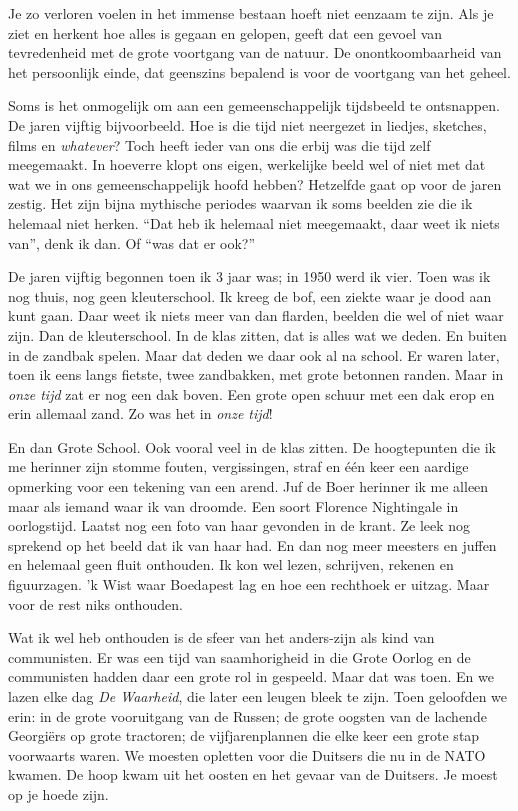 \documentclass[10pt,twoside, openright]{memoir}
\begin{document}
Je zo verloren voelen in het immense bestaan hoeft niet eenzaam te zijn. Als je ziet en herkent hoe alles is gegaan en gelopen, geeft dat een gevoel van tevredenheid met de grote voortgang van de natuur. De onontkoombaarheid van het persoonlijk einde, dat geenszins bepalend is voor de voortgang van het geheel.

Soms is het onmogelijk om aan een gemeenschappelijk tijdsbeeld te ontsnappen. De jaren vijftig bijvoorbeeld. Hoe is die tijd niet neergezet in liedjes, sketches, films en \emph{whatever}? Toch heeft ieder van ons die erbij was die tijd zelf meegemaakt. In hoeverre klopt ons eigen, werkelijke beeld wel of niet met dat wat we in ons gemeenschappelijk hoofd hebben? Hetzelfde gaat op voor de jaren zestig. Het zijn bijna mythische periodes waarvan ik soms beelden zie die ik helemaal niet herken. ``Dat heb ik helemaal niet meegemaakt, daar weet ik niets van'', denk ik dan. Of ``was dat er ook?''

De jaren vijftig begonnen toen ik 3 jaar was; in 1950 werd ik vier. Toen was ik nog thuis, nog geen kleuterschool. Ik kreeg de bof, een ziekte waar je dood aan kunt gaan. Daar weet ik niets meer van dan flarden, beelden die wel of niet waar zijn. Dan de kleuterschool. In de klas zitten, dat is alles wat we deden. En buiten in de zandbak spelen. Maar dat deden we daar ook al na school. Er waren later, toen ik eens langs fietste, twee zandbakken, met grote betonnen randen. Maar in \emph{onze tijd} zat er nog een dak boven. Een grote open schuur met een dak erop en erin allemaal zand. Zo was het in \emph{onze tijd}!

En dan Grote School. Ook vooral veel in de klas zitten. De hoogtepunten die ik me herinner zijn stomme fouten, vergissingen, straf en één keer een aardige opmerking voor een tekening van een arend. Juf de Boer herinner ik me alleen maar als iemand waar ik van droomde. Een soort Florence Nightingale in oorlogstijd. Laatst nog een foto van haar gevonden in de krant. Ze leek nog sprekend op het beeld dat ik van haar had. En dan nog meer meesters en juffen en helemaal geen fluit onthouden. Ik kon wel lezen, schrijven, rekenen en figuurzagen. 'k Wist waar Boedapest lag en hoe een rechthoek er uitzag. Maar voor de rest niks onthouden.

Wat ik wel heb onthouden is de sfeer van het anders-zijn als kind van communisten. Er was een tijd van saamhorigheid in die Grote Oorlog en de communisten hadden daar een grote rol in gespeeld. Maar dat was toen. En we lazen elke dag \emph{De Waarheid}, die later een leugen bleek te zijn. Toen geloofden we erin: in de grote vooruitgang van de Russen; de grote oogsten van de lachende Georgiërs op grote tractoren; de vijfjarenplannen die elke keer een grote stap voorwaarts waren. We moesten opletten voor die Duitsers die nu in de NATO kwamen. De hoop kwam uit het oosten en het gevaar van de Duitsers. Je moest op je hoede zijn.
\end{document}

